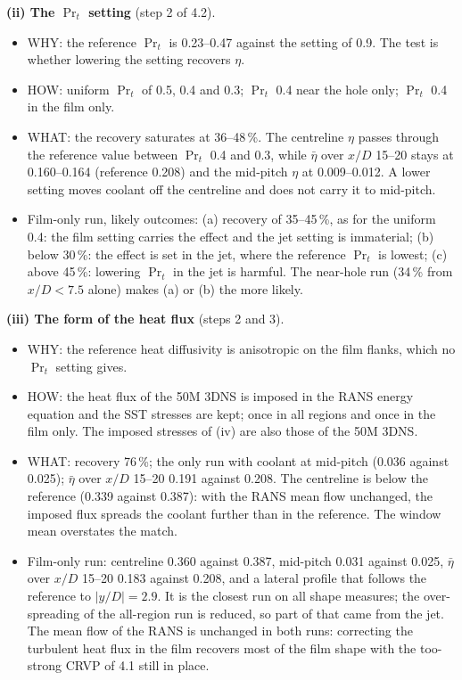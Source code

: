 \documentclass[10pt]{article}
\begin{document}
\textbf{(ii) The $\Pr_t$ setting} (step 2 of 4.2).
\begin{itemize}
\item WHY: the reference $\Pr_t$ is 0.23--0.47 against the setting of 0.9. The test is whether lowering the
  setting recovers $\eta$.
\item HOW: uniform $\Pr_t$ of 0.5, 0.4 and 0.3; $\Pr_t$ 0.4 near the hole only; $\Pr_t$ 0.4 in the film only.
\item WHAT: the recovery saturates at 36--48\,\%. The centreline $\eta$ passes through the reference value
  between $\Pr_t$ 0.4 and 0.3, while $\bar\eta$ over $x/D$ 15--20 stays at 0.160--0.164 (reference 0.208) and the mid-pitch $\eta$ at
  0.009--0.012. A lower setting moves coolant off the centreline and does not carry it to mid-pitch.
\item Film-only run, likely outcomes: (a) recovery of 35--45\,\%, as for the uniform 0.4: the film setting carries
  the effect and the jet setting is immaterial; (b) below 30\,\%: the effect is set in the jet, where the
  reference $\Pr_t$ is lowest; (c) above 45\,\%: lowering $\Pr_t$ in the jet is harmful. The near-hole run (34\,\%
  from $x/D<7.5$ alone) makes (a) or (b) the more likely.
\end{itemize}

\textbf{(iii) The form of the heat flux} (steps 2 and 3).
\begin{itemize}
\item WHY: the reference heat diffusivity is anisotropic on the film flanks, which no $\Pr_t$ setting gives.
\item HOW: the heat flux of the 50M 3DNS is imposed in the RANS energy equation and the SST stresses are kept;
  once in all regions and once in the film only. The imposed stresses of (iv) are also those of the 50M 3DNS.
\item WHAT: recovery 76\,\%; the only run with coolant at mid-pitch (0.036 against 0.025); $\bar\eta$ over $x/D$ 15--20
  0.191 against 0.208. The centreline is below the reference (0.339 against 0.387): with the RANS mean flow
  unchanged, the imposed flux spreads the coolant further than in the reference. The window mean overstates the
  match.
\item Film-only run: centreline 0.360 against 0.387, mid-pitch 0.031 against 0.025, $\bar\eta$ over $x/D$ 15--20
  0.183 against 0.208, and a lateral profile that follows the reference to $|y/D|=2.9$. It is the closest run
  on all shape measures; the over-spreading of the all-region run is reduced, so part of that came from the jet.
  The mean flow of the RANS is unchanged in both runs: correcting the turbulent heat flux in the film recovers
  most of the film shape with the too-strong CRVP of 4.1 still in place.
\end{itemize}
\end{document}
